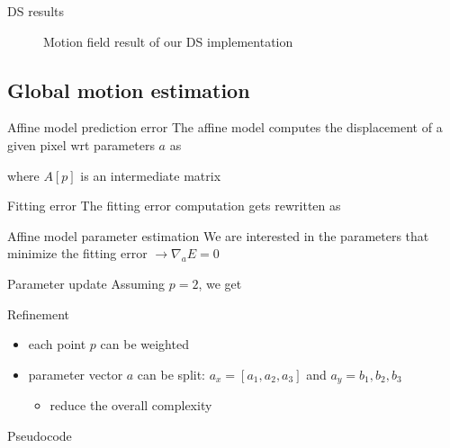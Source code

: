\documentclass[aspectratio=1610,xcolor=dvipsnames]{beamer}
\begin{document}
\begin{frame}{DS results}
\begin{figure}[H]
\begin{minipage}[b]{0.45\textwidth}
            \label{fig:bbme-3-res}
		\end{minipage}
        \label{fig:bbme-3}
        \caption{Motion field result of our DS implementation}
	\end{figure}
\end{frame}

\subsection{Global motion estimation}
\begin{frame}{Affine model prediction error}
    The affine model computes the displacement of a given pixel wrt parameters \(a\) as
    
    where \(A[p]\) is an intermediate matrix
    
    \begin{block}{Fitting error}
        The fitting error computation gets rewritten as
        
    \end{block}
\end{frame}

\begin{frame}{Affine model parameter estimation}
    We are interested in the parameters that minimize the fitting error \(\to \nabla_a E = 0\)
    \begin{block}{Parameter update}
        Assuming \(p = 2\), we get
        
    \end{block}
    \begin{exampleblock}{Refinement}
        \begin{itemize}
            \item each point \(p\) can be weighted
            \item parameter vector \(a\) can be split: \(a_x = [a_1,a_2,a_3]\) and \(a_y = b_1,b_2,b_3\)
            \begin{itemize}
                \item reduce the overall complexity
            \end{itemize}
        \end{itemize}
        
    \end{exampleblock}
\end{frame}

\begin{frame}{Pseudocode}
     
\end{frame}
\end{document}
